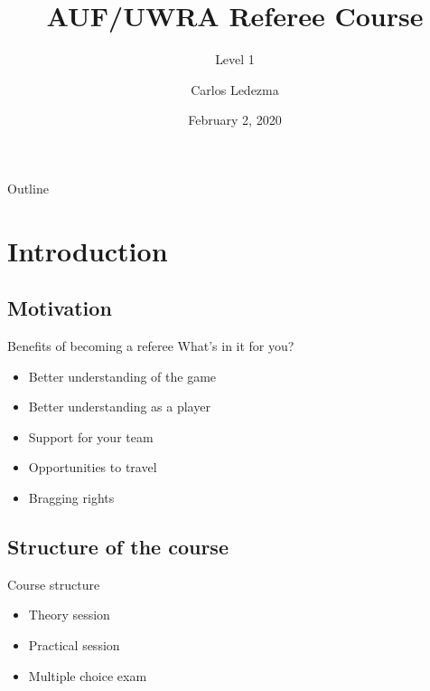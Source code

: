 \documentclass{beamer}
\title{AUF/UWRA Referee Course}
\subtitle{Level 1}
\author{Carlos Ledezma}
\date{February 2, 2020}
\begin{document}
    \begin{frame}
        \titlepage
    \end{frame}

    \begin{frame}{Outline}
    \end{frame}

    \section{Introduction}
    \subsection{Motivation}

    \begin{frame}{Benefits of becoming a referee}
        What's in it for you? \pause
        \begin{itemize}
            \item Better understanding of the game \pause
            \item Better understanding as a player \pause
            \item Support for your team \pause
            \item Opportunities to travel \pause
            \item Bragging rights
        \end{itemize}
    \end{frame}

    \subsection{Structure of the course}
    \begin{frame}{Course structure}
        \begin{itemize}
            \item Theory session \pause
            \item Practical session \pause
            \item Multiple choice exam
        \end{itemize}
    \end{frame}
\end{document}
